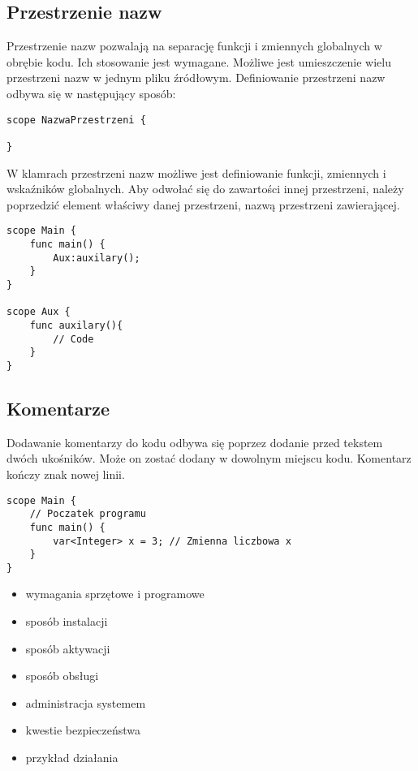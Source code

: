 \subsection{Przestrzenie nazw}
Przestrzenie nazw pozwalają na separację funkcji i zmiennych globalnych w obrębie kodu. Ich stosowanie jest wymagane. Możliwe jest umieszczenie wielu przestrzeni nazw w jednym pliku źródłowym. Definiowanie przestrzeni nazw odbywa się w następujący sposób:
\begin{lstlisting}
scope NazwaPrzestrzeni {

}
\end{lstlisting}
W klamrach przestrzeni nazw możliwe jest definiowanie funkcji, zmiennych i wskaźników globalnych. Aby odwołać się do zawartości innej przestrzeni, należy poprzedzić element właściwy danej przestrzeni, nazwą przestrzeni zawierającej.
\begin{lstlisting}
scope Main {
	func main() {
		Aux:auxilary();	
	}
}

scope Aux {
	func auxilary(){
		// Code
	}
}
\end{lstlisting}

\subsection{Komentarze}
Dodawanie komentarzy do kodu odbywa się poprzez dodanie przed tekstem dwóch ukośników. Może on zostać dodany w dowolnym miejscu kodu. Komentarz kończy znak nowej linii.
\begin{lstlisting}
scope Main {
	// Poczatek programu
	func main() {
		var<Integer> x = 3; // Zmienna liczbowa x
	}
}
\end{lstlisting}

\begin{itemize}
\item  wymagania sprzętowe i programowe
\item  sposób instalacji
\item  sposób aktywacji
\item  sposób obsługi
\item  administracja systemem
\item  kwestie bezpieczeństwa
\item  przykład działania
\end{itemize}

